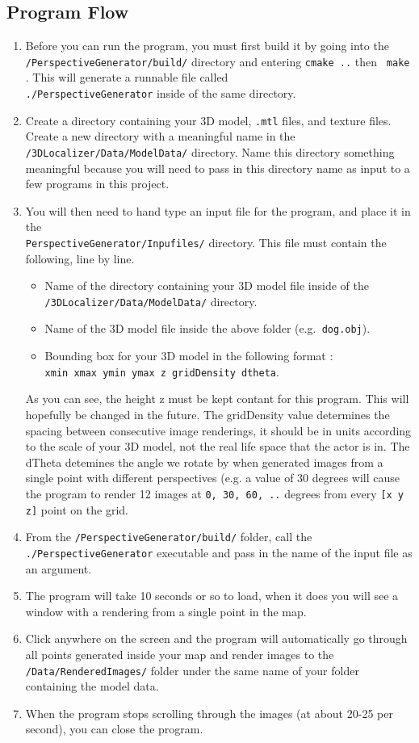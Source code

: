 \documentclass[a4paper,11pt]{article}
\begin{document}
        \subsection{Program Flow}
	\begin{enumerate}
	 \item Before you can run the program, you must first build it by going into the \texttt{/PerspectiveGenerator/build/} directory and entering
	 \texttt{cmake ..} then \texttt{ make }.
	 This will generate a runnable file called \\ \texttt{./PerspectiveGenerator} inside of the same directory. 
	 \item Create a directory containing your 3D model, \texttt{.mtl} files, and texture files. Create a new directory with a meaningful name in the \texttt{/3DLocalizer/Data/ModelData/} directory. Name this directory something meaningful because you will need to pass in this directory name as input to a few programs in this project.
	 \item You will then need to hand type an input file for the program, and place it in the \\ \texttt{PerspectiveGenerator/Inpufiles/} directory. This file must contain the following, line by line.
	  \begin{itemize}
	  \item Name of the directory containing your 3D model file inside of the  \texttt{/3DLocalizer/Data/ModelData/} directory.
	  \item Name of the 3D model file inside the above folder (e.g.\texttt{ dog.obj}).
	  \item Bounding box for your 3D model in the following format : \\ \texttt{xmin xmax ymin ymax z gridDensity dtheta}.
	  \end{itemize} 
	As you can see, the height z must be kept contant for this program. This will hopefully be changed in the future. The gridDensity value determines the spacing between consecutive image renderings, it should be in units according to the scale of your 3D model, not the real life space that the actor is in. The dTheta detemines the angle we rotate by when generated images from a single point with different perspectives (e.g. a value of 30 degrees will cause the program to render 12 images at \texttt{0, 30, 60, ..} degrees from every \texttt{[x y z]} point on the grid.
	\item From the \texttt{/PerspectiveGenerator/build/} folder, call the \texttt{./PerspectiveGenerator} executable and pass in the name of the input file as an argument.
	\item The program will take 10 seconds or so to load, when it does you will see a window with a rendering from a single point in the map. 
	\item Click anywhere on the screen and the program will automatically go through all points generated inside your map and render images to the
	  \texttt{/Data/RenderedImages/} folder under the same name of your folder containing the model data.
	\item When the program stops scrolling through the images (at about 20-25 per second), you can close the program.
	\end{enumerate}
	
\end{document}
